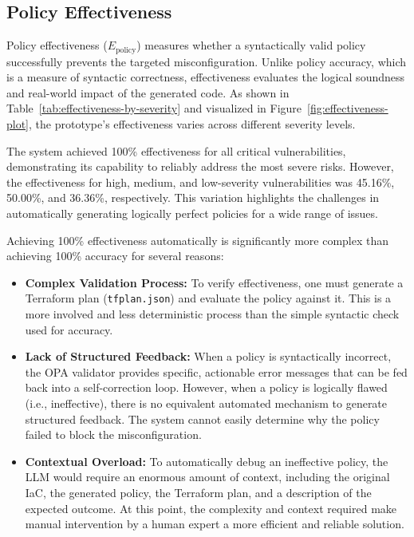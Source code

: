 \subsection{Policy Effectiveness}
Policy effectiveness ($E_{\text{policy}}$) measures whether a syntactically valid policy successfully prevents the targeted misconfiguration. Unlike policy accuracy, which is a measure of syntactic correctness, effectiveness evaluates the logical soundness and real-world impact of the generated code. As shown in Table~\ref{tab:effectiveness-by-severity} and visualized in Figure~\ref{fig:effectiveness-plot}, the prototype's effectiveness varies across different severity levels.

The system achieved 100\% effectiveness for all critical vulnerabilities, demonstrating its capability to reliably address the most severe risks. However, the effectiveness for high, medium, and low-severity vulnerabilities was 45.16\%, 50.00\%, and 36.36\%, respectively. This variation highlights the challenges in automatically generating logically perfect policies for a wide range of issues.

Achieving 100\% effectiveness automatically is significantly more complex than achieving 100\% accuracy for several reasons:
\begin{itemize}
    \item \textbf{Complex Validation Process:} To verify effectiveness, one must generate a Terraform plan (\texttt{tfplan.json}) and evaluate the policy against it. This is a more involved and less deterministic process than the simple syntactic check used for accuracy.
    \item \textbf{Lack of Structured Feedback:} When a policy is syntactically incorrect, the OPA validator provides specific, actionable error messages that can be fed back into a self-correction loop. However, when a policy is logically flawed (i.e., ineffective), there is no equivalent automated mechanism to generate structured feedback. The system cannot easily determine why the policy failed to block the misconfiguration.
    \item \textbf{Contextual Overload:} To automatically debug an ineffective policy, the LLM would require an enormous amount of context, including the original IaC, the generated policy, the Terraform plan, and a description of the expected outcome. At this point, the complexity and context required make manual intervention by a human expert a more efficient and reliable solution.
\end{itemize}

